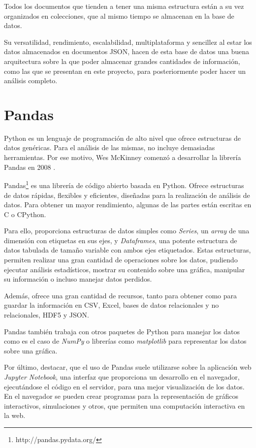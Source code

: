 \documentclass[a4paper, 12pt]{book}
\begin{document}
Todos los documentos que tienden a tener una misma estructura están a su vez organizados en colecciones, que al mismo tiempo se almacenan en la base de datos.

Su versatilidad, rendimiento, escalabilidad, multiplataforma y sencillez al estar los datos almacenados en documentos JSON, hacen de esta base de datos una buena arquitectura sobre la que  poder almacenar grandes cantidades de información, como las que se presentan en este proyecto, para posteriormente poder hacer un análisis completo.



\section{Pandas} 
\label{sec:seccion5}
Python es un lenguaje de programación de alto nivel que ofrece estructuras de datos genéricas. Para el análisis de las mismas, no incluye demasiadas herramientas. Por ese motivo, Wes McKinney comenzó a desarrollar la librería Pandas en 2008 \cite{mckinney2012python}.

Pandas\footnote{http://pandas.pydata.org/} es una librería de código abierto basada en Python. Ofrece estructuras de datos rápidas, flexibles y eficientes, diseñadas para la realización de análisis de datos. Para obtener un mayor rendimiento, algunas de las partes están escritas en C o CPython.

Para ello, proporciona estructuras de datos simples como \textit{Series}, un \textit{array} de una dimensión con etiquetas en sus ejes, y \textit{Dataframes}, una potente estructura de datos tabulada de tamaño variable con ambos ejes etiquetados. Estas estructuras, permiten realizar una gran cantidad de operaciones sobre los datos, pudiendo ejecutar análisis estadísticos, mostrar su contenido sobre una gráfica, manipular su información o incluso manejar datos perdidos.

Además, ofrece una gran cantidad de recursos, tanto para obtener como para guardar la información en CSV, Excel, bases de datos relacionales y no relacionales, HDF5 y JSON.

Pandas también trabaja con otros paquetes de Python para manejar los datos como es el caso de \textit{NumPy} o librerías como \textit{matplotlib} para representar los datos sobre una gráfica.

Por último, destacar, que el uso de Pandas suele utilizarse sobre la aplicación web \textit{Jupyter Notebook}, una interfaz que proporciona un desarrollo en el navegador, ejecutándose el código en el servidor, para una mejor visualización de los datos. En el navegador se pueden crear programas para la representación de gráficos interactivos, simulaciones y otros, que permiten una computación interactiva en la web.
\end{document}
